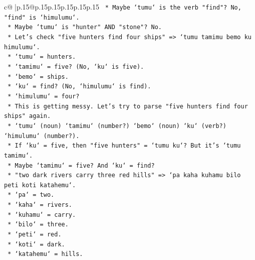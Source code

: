 \documentclass{article}
\begin{document}
{\begin{supertabular}{c@{$\;$}|p{.15\linewidth}@{}p{.15\linewidth}p{.15\linewidth}p{.15\linewidth}p{.15\linewidth}p{.15\linewidth}}
{{{\texttt{                                *   Maybe `tumu` is the verb "find"? No, "find" is `himulumu`.} \\
\texttt{                                *   Maybe `tumu` is "hunter" AND "stone"? No.} \\
\texttt{                                *   Let's check "five hunters find four ships" => `tumu tamimu bemo ku himulumu`.} \\
\texttt{                                    *   `tumu` = hunters.} \\
\texttt{                                    *   `tamimu` = five? (No, `ku` is five).} \\
\texttt{                                    *   `bemo` = ships.} \\
\texttt{                                    *   `ku` = find? (No, `himulumu` is find).} \\
\texttt{                                    *   `himulumu` = four?} \\
\texttt{                                    *   This is getting messy. Let's try to parse "five hunters find four ships" again.} \\
\texttt{                                    *   `tumu` (noun) `tamimu` (number?) `bemo` (noun) `ku` (verb?) `himulumu` (number?).} \\
\texttt{                                    *   If `ku` = five, then "five hunters" = `tumu ku`? But it's `tumu tamimu`.} \\
\texttt{                                    *   Maybe `tamimu` = five? And `ku` = find?} \\
\texttt{                                    *   "two dark rivers carry three red hills" => `pa kaha kuhamu bilo peti koti katahemu`.} \\
\texttt{                                        *   `pa` = two.} \\
\texttt{                                        *   `kaha` = rivers.} \\
\texttt{                                        *   `kuhamu` = carry.} \\
\texttt{                                        *   `bilo` = three.} \\
\texttt{                                        *   `peti` = red.} \\
\texttt{                                        *   `koti` = dark.} \\
\texttt{                                        *   `katahemu` = hills.} \\
}}}
\end{supertabular}}
\end{document}

